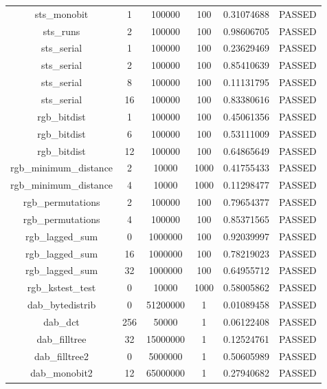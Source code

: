 \begin{itemize}
\begin{table}[h!]
\begin{center}
\begin{tabular}{|c|c|c|c|c|c|}
    sts\_monobit &    1 &     100000 &      100 & 0.31074688 &   PASSED \\  
    sts\_runs &    2 &     100000 &      100 & 0.98606705 &   PASSED \\  
    sts\_serial &    1 &     100000 &      100 & 0.23629469 &   PASSED \\  
    sts\_serial &    2 &     100000 &      100 & 0.85410639 &   PASSED \\  
    sts\_serial &    8 &     100000 &      100 & 0.11131795 &   PASSED \\  
    sts\_serial &   16 &     100000 &      100 & 0.83380616 &   PASSED \\  
    rgb\_bitdist &    1 &     100000 &      100 & 0.45061356 &   PASSED \\  
    rgb\_bitdist &    6 &     100000 &      100 & 0.53111009 &   PASSED \\   
    rgb\_bitdist &   12 &     100000 &      100 & 0.64865649 &   PASSED \\  
    rgb\_minimum\_distance &    2 &      10000 &     1000 & 0.41755433 &   PASSED \\   
    rgb\_minimum\_distance &    4 &      10000 &     1000 & 0.11298477 &   PASSED \\  
    rgb\_permutations &    2 &     100000 &      100 & 0.79654377 &   PASSED \\ 
    rgb\_permutations &    4 &     100000 &      100 & 0.85371565 &   PASSED \\  
    rgb\_lagged\_sum &    0 &    1000000 &      100 & 0.92039997 &   PASSED \\   
    rgb\_lagged\_sum &   16 &    1000000 &      100 & 0.78219023 &   PASSED \\   
    rgb\_lagged\_sum &   32 &    1000000 &      100 & 0.64955712 &   PASSED \\  
    rgb\_kstest\_test &    0 &      10000 &     1000 & 0.58005862 &   PASSED \\  
    dab\_bytedistrib &    0 &   51200000 &        1 & 0.01089458 &   PASSED \\  
    dab\_dct &  256 &      50000 &        1 & 0.06122408 &   PASSED \\  
    dab\_filltree &   32 &   15000000 &        1 & 0.12524761 &   PASSED \\   
    dab\_filltree2 &    0 &    5000000 &        1 & 0.50605989 &   PASSED \\  
    dab\_monobit2 &   12 &   65000000 &        1 & 0.27940682 &   PASSED \\  
        

\end{tabular}
\end{center}
\end{table}
\end{itemize}
